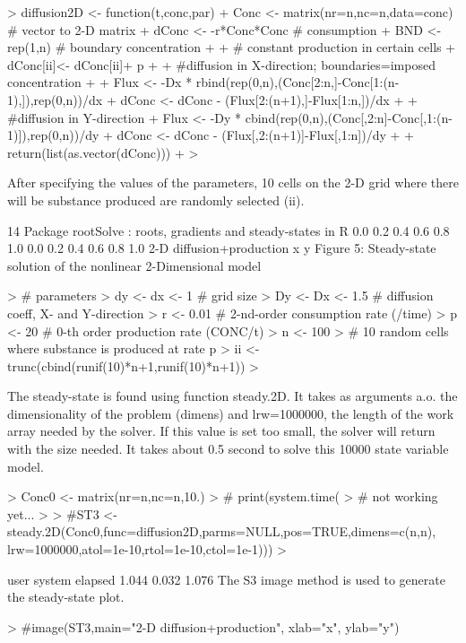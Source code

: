 \documentclass{article}
\begin{document}
\begin{Schunk}
\begin{Sinput}
> diffusion2D <- function(t,conc,par){
+ Conc <- matrix(nr=n,nc=n,data=conc) # vector to 2-D matrix
+ dConc <- -r*Conc*Conc # consumption
+ BND <- rep(1,n) # boundary concentration
+ 
+ # constant production in certain cells
+ dConc[ii]<- dConc[ii]+ p
+ 
+ #diffusion in X-direction; boundaries=imposed concentration
+ 
+ Flux <- -Dx * rbind(rep(0,n),(Conc[2:n,]-Conc[1:(n-1),]),rep(0,n))/dx
+ dConc <- dConc - (Flux[2:(n+1),]-Flux[1:n,])/dx
+ 
+ #diffusion in Y-direction
+ Flux <- -Dy * cbind(rep(0,n),(Conc[,2:n]-Conc[,1:(n-1)]),rep(0,n))/dy
+ dConc <- dConc - (Flux[,2:(n+1)]-Flux[,1:n])/dy
+ 
+ return(list(as.vector(dConc)))
+ }
> 
\end{Sinput}
\end{Schunk}

After specifying the values of the parameters, 10 cells on the 2-D grid where there will be
substance produced are randomly selected (ii).

14 Package rootSolve : roots, gradients and steady-states in R
0.0 0.2 0.4 0.6 0.8 1.0
0.0 0.2 0.4 0.6 0.8 1.0
2-D diffusion+production
x
y
Figure 5: Steady-state solution of the nonlinear 2-Dimensional model
\begin{Schunk}
\begin{Sinput}
> # parameters
> dy <- dx <- 1 # grid size
> Dy <- Dx <- 1.5 # diffusion coeff, X- and Y-direction
> r <- 0.01 # 2-nd-order consumption rate (/time)
> p <- 20 # 0-th order production rate (CONC/t)
> n <- 100
> # 10 random cells where substance is produced at rate p
> ii <- trunc(cbind(runif(10)*n+1,runif(10)*n+1))
> 
\end{Sinput}
\end{Schunk}
The steady-state is found using function steady.2D. It takes as arguments a.o. the dimensionality
of the problem (dimens) and lrw=1000000, the length of the work array needed by
the solver. If this value is set too small, the solver will return with the size needed.
It takes about 0.5 second to solve this 10000 state variable model.

\begin{Schunk}
\begin{Sinput}
> Conc0 <- matrix(nr=n,nc=n,10.)
> # print(system.time(
> # not working yet...
> 
> #ST3 <- steady.2D(Conc0,func=diffusion2D,parms=NULL,pos=TRUE,dimens=c(n,n), lrw=1000000,atol=1e-10,rtol=1e-10,ctol=1e-1)))
> 
\end{Sinput}
\end{Schunk}
user system elapsed
1.044 0.032 1.076
The S3 image method is used to generate the steady-state plot.

\begin{Schunk}
\begin{Sinput}
> #image(ST3,main="2-D diffusion+production", xlab="x", ylab="y")
\end{Sinput}
\end{Schunk}
\end{document}
